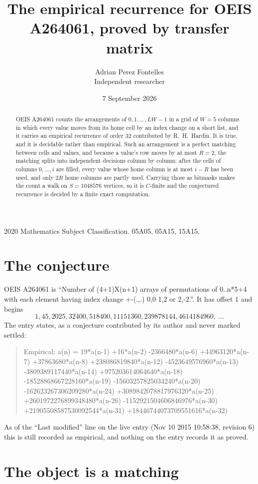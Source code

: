 \documentclass[11pt,a4paper]{article}
\title{The empirical recurrence for OEIS A264061, proved by transfer matrix}
\author{Adrian Perez Fontelles\\ \small Independent researcher}
\date{7 September 2026}
\theoremstyle{plain}
\theoremstyle{definition}
\begin{document}
\maketitle

\begin{abstract}
OEIS A264061 counts the arrangements of $0,1,\dots,LW-1$ in a grid of $W=5$ columns in which
every value moves from its home cell by an index change on a short list, and it carries an
empirical recurrence of order $32$ contributed by R.~H.~Hardin. It is true, and it is
decidable rather than empirical. Such an arrangement is a perfect matching between cells and
values, and because a value's row moves by at most $R=2$, the matching splits into
independent decisions column by column: after the cells of columns $0,\dots,i$ are filled,
every value whose home column is at most $i-R$ has been used, and only $2R$ home columns are
partly used. Carrying those as bitmasks makes the count a walk on $S=1048576$ vertices, so it is
$C$-finite and the conjectured recurrence is decided by a finite exact computation.
\end{abstract}

\noindent\small 2020 Mathematics Subject Classification. 05A05, 05A15, 15A15.\normalsize

\section{The conjecture}

OEIS A264061 is ``Number of (4+1)X(n+1) arrays of permutations of 0..n*5+4 with each element having index change +-(.,.) 0,0 1,2 or 2,-2.''. It has offset $1$ and begins
\[
1, 45, 2025, 32400, 518400, 11151360, 239878144, 4614184960,\ \dots
\]
The entry states, as a conjecture contributed by its author and never marked settled:
\begin{quote}
Empirical: a(n) = 19*a(n-1) +16*a(n-2) -2366480*a(n-6) +44963120*a(n-7) +37863680*a(n-8) +238086819840*a(n-12) -4523649576960*a(n-13) -3809389117440*a(n-14) +975203614064640*a(n-18) -18528868667228160*a(n-19) -15603257825034240*a(n-20) -162623267306209280*a(n-24) +3089842078817976320*a(n-25) +2601972276899348480*a(n-26) -1152921504606846976*a(n-30) +21905508587530092544*a(n-31) +18446744073709551616*a(n-32)
\end{quote}
As of the ``Last modified'' line on the live entry (Nov 10 2015 10:58:38, revision 6) this is still
recorded as empirical, and nothing on the entry records it as proved.

\section{The object is a matching}
\end{document}
